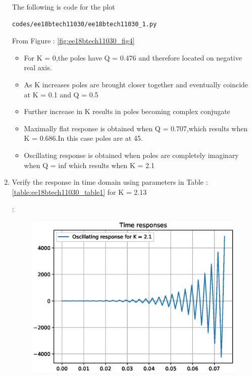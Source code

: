\begin{enumerate}[label=\arabic*.,ref=\theenumi]
The following is code for the  plot
\begin{lstlisting}
codes/ee18btech11030/ee18btech11030_1.py
\end{lstlisting}
From Figure : \ref{fig:ee18btech11030_fig4} 
\begin{itemize}
\item For K = 0,the poles have Q = 0.476 and therefore located on negative real axis. 
\item As K increases poles are brought closer together and eventually coincide at K = 0.1 and Q = 0.5
\item Further increase in K results in poles becoming complex conjugate 
\item Maximally flat response is obtained when Q = 0.707,which results when K = 0.686.In this case poles are at 45\degree .
\item Oscillating response is obtained when poles are completely imaginary when Q = inf which results when K = 2.1 
\end{itemize}

\begin{table}[!ht]
\centering

\caption{}
\label{table:ee18btech11030_table}
\end{table}


\item Verify the response in time domain using parameters in Table : \ref{table:ee18btech11030_table1} for K = 2.13

\solution :
\begin{figure}[!ht]
\centering
  \includegraphics[width=\columnwidth]{./figs/ee18btech11030/ee18btech11030_fc2.eps}
\caption{}
\label{fig:ee18btech11030_fig7} 
\end{figure}


\end{enumerate}
